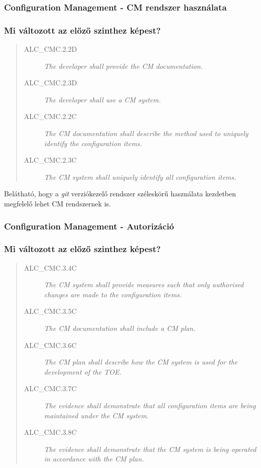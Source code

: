 \pagebreak[0]
\subsubsection{Configuration Management - CM rendszer használata}
\subsubsection{Mi változott az előző szinthez képest?}

\begin{quote}
    \begin{description}
        \item[ALC\_CMC.2.2D]{\emph{The developer shall provide the CM documentation.}}
        \item[ALC\_CMC.2.3D]{\emph{The developer shall use a CM system.}}
        \item[ALC\_CMC.2.2C]{\emph{The CM documentation shall describe the method used to uniquely
            identify the configuration items.}}
        \item[ALC\_CMC.2.3C]{\emph{The CM system shall uniquely identify all configuration items.}}
    \end{description}
\end{quote}
Belátható, hogy a \emph{git} verziókezelő rendszer széleskörű használata kezdetben megfelelő
lehet CM rendszernek is.

\pagebreak[1]
\subsubsection{Configuration Management - Autorizáció}
\subsubsection{Mi változott az előző szinthez képest?}
\begin{quote}
    \begin{description}
        \item[ALC\_CMC.3.4C]{\emph{The CM system shall provide measures such that only authorised
            changes are made to the configuration items.}}
        \item[ALC\_CMC.3.5C]{\emph{The CM documentation shall include a CM plan.}}
        \item[ALC\_CMC.3.6C]{\emph{The CM plan shall describe how the CM system is used for the
            development of the TOE.}}
        \item[ALC\_CMC.3.7C]{\emph{The evidence shall demonstrate that all configuration items are
            being maintained under the CM system.}}
        \item[ALC\_CMC.3.8C]{\emph{The evidence shall demonstrate that the CM system is being
            operated in accordance with the CM plan.}}
    \end{description}
\end{quote}

